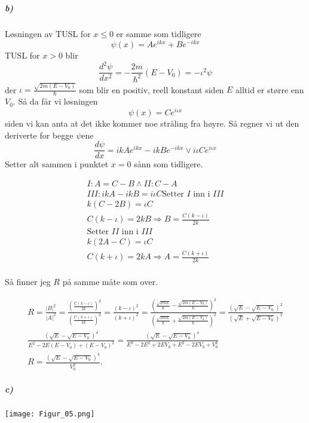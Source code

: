 \documentclass[11pt, A4paper,norsk]{article}
\begin{document}
			\subparagraph{b)}
				\begin{flushleft}
Løsningen av TUSL for $x \leq 0$ er samme som tidligere
$$\psi(x) = Ae^{i k x} + Be^{- i k x}$$
TUSL for $x > 0$ blir
$$\frac{d^2 \psi}{dx^2} = - \frac{2 m}{\hbar^2} (E - V_0) = - \iota^2 \psi$$
der $\iota = \frac{\sqrt{2 m (E - V_0)}}{\hbar}$ som blir en positiv, reell konstant siden $E$ alltid er større enn $V_0$. Så da får vi løsningen
$$\psi(x) = C e^{i \iota x}$$
siden vi kan anta at det ikke kommer noe stråling fra høyre. Så regner vi ut den deriverte for begge $\psi$ene
$$\frac{d \psi}{dx} = i k A e^{i k x} - i k B e^{- i k x} \vee i \iota C e^{i \iota x}$$
Setter alt sammen i punktet $x = 0$ sånn som tidligere.
				\end{flushleft}
				\begin{gather*}
I : A = C - B \wedge II : C - A \\
III : ikA - ikB = i \iota C
\text{Setter $I$ inn i $III$} \\
k(C - 2B) = \iota C \\
C(k - \iota) = 2 k B \Rightarrow B = \frac{C(k - \iota)}{2 k} \\
\text{Setter $II$ inn i $III$} \\
k(2A - C) = \iota C \\
C(k + \iota) = 2 k A \Rightarrow A = \frac{C(k + \iota)}{2 k} \\
				\end{gather*}
				\begin{flushleft}
Så finner jeg $R$ på samme måte som over.
				\end{flushleft}
				\begin{gather*}
R = \frac{|B|^2}{|A|^2} = \frac{\left( \frac{C(k - \iota)}{2 k} \right)^2}{\left( \frac{C(k + \iota)}{2 k} \right)^2} = \frac{\left( k - \iota \right)^2}{\left( k + \iota \right)^2} = \frac{\left( \frac{\sqrt{2 m E}}{\hbar} - \frac{\sqrt{2 m (E - V_0)}}{\hbar} \right)^2}{\left( \frac{\sqrt{2 m E}}{\hbar} + \frac{\sqrt{2 m (E - V_0)}}{\hbar} \right)^2} = \frac{\left( \sqrt{E} - \sqrt{E - V_0} \right)^2}{\left( \sqrt{E} + \sqrt{E - V_0} \right)^2} \\
\frac{\left( \sqrt{E} - \sqrt{E - V_0} \right)^4}{E^2 - 2 E (E - V_0) + (E - V_0)^2} = \frac{\left( \sqrt{E} - \sqrt{E - V_0} \right)^4}{E^2 - 2 E^2 + 2 E V_0 + E^2 - 2 E V_0 + V_0^2} \\
R = \frac{\left( \sqrt{E} - \sqrt{E - V_0} \right)^4}{V_0^2}.
				\end{gather*}








			\subparagraph{c)}
\texttt{[image: Figur\_05.png]}

\end{document}
